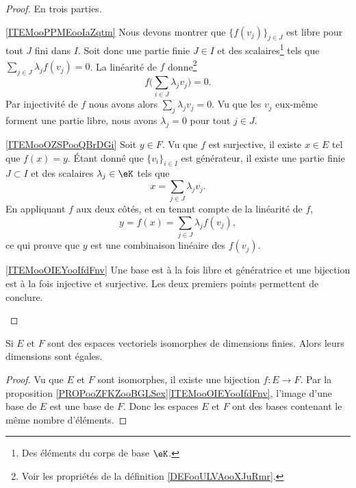 \begin{proof}
	En trois parties.
	\begin{subproof}
		\item[\ref{ITEMooPPMEooIaZqtm}]
		Nous devons montrer que \( \{f(v_j)\}_{j\in J}\) est libre pour tout \( J\) fini dans \( I\). Soit donc une partie finie \( J\in I\) et des scalaires\footnote{Des éléments du corps de base \( \eK\).} tels que \( \sum_{j\in J}\lambda_jf(v_j)=0\). La linéarité de \( f\) donne\footnote{Voir les propriétés de la définition \ref{DEFooULVAooXJuRmr}.}
		\begin{equation}
			f\big( \sum_{i\in J}\lambda_jv_j \big)=0.
		\end{equation}
		Par injectivité de \( f\) nous avons alors \( \sum_j\lambda_jv_j=0\). Vu que les \( v_j\) eux-même forment une partie libre, nous avons \( \lambda_j=0\) pour tout \( j\in J\).
		\item[\ref{ITEMooOZSPooQBrDGi}]
		Soit \( y\in F\). Vu que \( f\) est surjective, il existe \( x\in E\) tel que \( f(x)=y\). Étant donné que \( \{v_i\}_{i\in I}\) est générateur, il existe une partie finie \( J\subset I\) et des scalaires \( \lambda_j\in \eK\) tels que
		\begin{equation}
			x=\sum_{j\in J}\lambda_jv_j.
		\end{equation}
		En appliquant \( f\) aux deux côtés, et en tenant compte de la linéarité de \( f\),
		\begin{equation}
			y=f(x)=\sum_{j\in J}\lambda_jf(v_j),
		\end{equation}
		ce qui prouve que \( y\) est une combinaison linéaire des \( f(v_j)\).
		\item[\ref{ITEMooOIEYooIfdFnv}]
		Une base est à la fois libre et génératrice et une bijection est à la fois injective et surjective. Les deux premiers points permettent de conclure.
	\end{subproof}
\end{proof}

\begin{corollary}        \label{CORooXIPKooWThOsr}
	Si \( E\) et \( F\) sont des espaces vectoriels isomorphes de dimensions finies. Alors leurs dimensions sont égales.
\end{corollary}

\begin{proof}
	Vu que \( E\) et \( F\) sont isomorphes, il existe une bijection \( f\colon E\to F\). Par la proposition \ref{PROPooZFKZooBGLSex}\ref{ITEMooOIEYooIfdFnv}, l'image d'une base de \( E\) est une base de \( F\). Donc les espaces \( E\) et \( F\) ont des bases contenant le même nombre d'éléments.
\end{proof}

